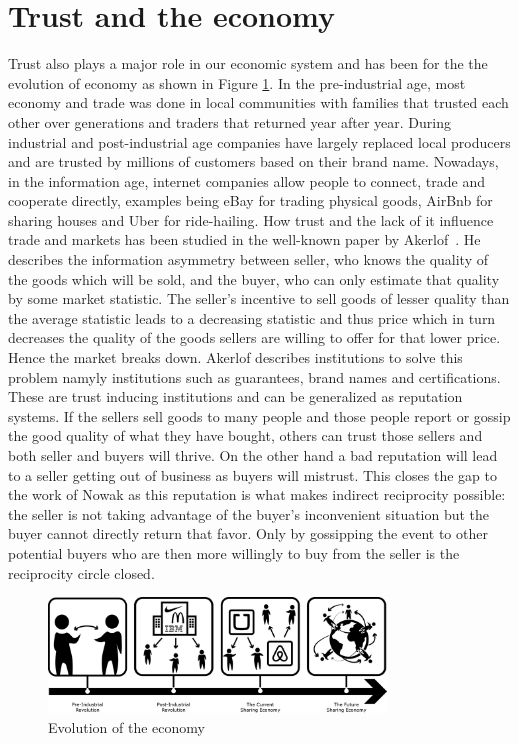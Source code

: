 \section{Trust and the economy}
Trust also plays a major role in our economic system and has been for the the evolution of economy 
as shown in Figure \ref{fig:economy}. In the pre-industrial age, most economy and trade was done in local
communities with families that trusted each other over generations and traders that returned year
after year. During industrial and post-industrial age companies have largely replaced local 
producers and are trusted by millions of customers based on their brand name. Nowadays, in the 
information age, internet companies allow people to connect, trade and cooperate directly, examples
being eBay for trading physical goods, AirBnb for sharing houses and Uber for ride-hailing. How trust
and the lack of it influence trade and markets has been studied in the well-known paper by 
Akerlof~\cite{akerlof1970lemons}. He describes the information asymmetry between seller, who knows
the quality of the goods which will be sold, and the buyer, who can only estimate that quality by 
some market statistic. The seller's incentive to sell goods of lesser quality than the average 
statistic leads to a decreasing statistic and thus price which in turn decreases the quality of the 
goods sellers are willing to offer for that lower price. Hence the market breaks down. Akerlof
describes institutions to solve this problem namyly institutions such as guarantees, brand names and
certifications. These are trust inducing institutions and can be generalized as reputation systems.
If the sellers sell goods to many people and those people report or gossip the good quality of what
they have bought, others can trust those sellers and both seller and buyers will thrive. On the 
other hand a bad reputation will lead to a seller getting out of business as buyers will mistrust.
This closes the gap to the work of Nowak as this reputation is what makes indirect reciprocity
possible: the seller is not taking advantage of the buyer's inconvenient situation but the buyer
cannot directly return that favor. Only by gossipping the event to other potential buyers who are 
then more willingly to buy from the seller is the reciprocity circle closed.~\cite{nowak2006five}

\begin{figure}[t]
    \centering
    \includegraphics[width=0.8\textwidth]{images/economy.png}
    \caption{Evolution of the economy}
    \label{fig:economy}
\end{figure}

